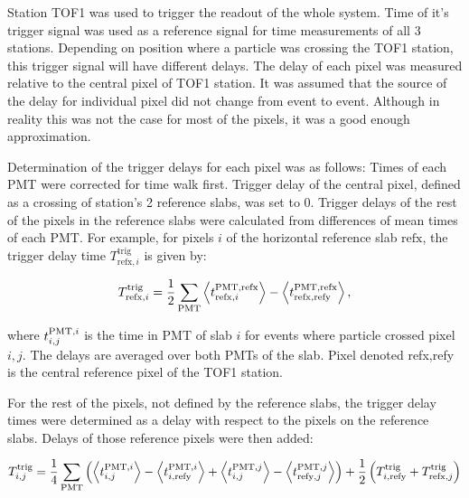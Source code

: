 Station TOF1 was used to trigger the readout of the whole system. Time
of it's trigger signal was used as a reference signal for time
measurements of all 3 stations. Depending on position where a particle
was crossing the TOF1 station, this trigger signal will have different
delays. The delay of each pixel was measured relative to the central
pixel of TOF1 station. It was assumed that the source of the delay for
individual pixel did not change from event to event. Although in
reality this was not the case for most of the pixels, it was a good
enough approximation.

Determination of the trigger delays for each pixel was as follows:
Times of each PMT were corrected for time walk first. Trigger delay of
the central pixel, defined as a crossing of station's 2 reference
slabs, was set to 0. Trigger delays of the rest of the pixels in the
reference slabs were calculated from differences of mean times of each
PMT. For example, for pixels $i$ of the horizontal reference slab
$\text{refx}$, the trigger delay time $T^\text{trig}_{\text{refx},i}$
is given by:
%
\begin{linenomath}
  \begin{equation}
    \label{eq:trigdel:a}
    T^\text{trig}_{\text{refx},i} =
    \frac12\sum_{\text{PMT}}
    \left< t^{\text{PMT}, \text{refx}}_{\text{refx},i} \right> -
    \left< t^{\text{PMT},\text{refx}}_{\text{refx},\text{refy}} \right>,
  \end{equation}
\end{linenomath}
%
where $t^{\text{PMT}, i}_{i,j}$ is the time in PMT of slab $i$ for events
where particle crossed pixel $i, j$. The delays are averaged over both
PMTs of the slab. Pixel denoted refx,refy is the central reference
pixel of the TOF1 station.

For the rest of the pixels, not defined by the reference slabs, the
trigger delay times were determined as a delay with respect to the
pixels on the reference slabs. Delays of those reference pixels were
then added:
%
\newcommand{\Ttrig}[1]{\ensuremath{T^\text{trig}_{#1}}}
%
\begin{linenomath}
  \begin{equation}
    \Ttrig{i,j} =
    \frac14\sum_{\PMT}
    \left(
      \mean{\ttrig{\PMT,i}{i,j}} - \mean{\ttrig{\PMT,i}{i,\text{refy}}} +
      \mean{\ttrig{\PMT,j}{i,j}} - \mean{\ttrig{\PMT,j}{\text{refy},j}}
    \right)
    + \frac12
    \left(
      \Ttrig{i,\text{refy}} + \Ttrig{\text{refx},j}
    \right)
    \label{eq:trigdel:both}
  \end{equation}
\end{linenomath}

